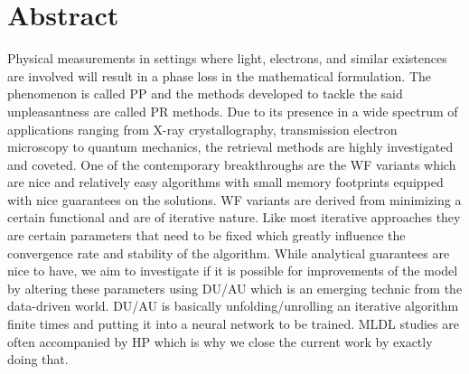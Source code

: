 \chapter*{Abstract}

Physical measurements in settings where light, electrons, and similar existences are involved will result in a phase 
loss\cite{Shechtman2015} in the mathematical formulation. The phenomenon is called \ac{PP}\cite{Shechtman2015} 
and the methods developed to tackle the said unpleasantness are called 
\ac{PR}\cite{Jaganathan2015}\cite{Liu2019} methods. Due to its presence in a wide spectrum of 
applications\cite{Shechtman2015}\cite{Candes2014} ranging from X-ray crystallography, transmission electron microscopy 
to quantum mechanics, the retrieval methods are highly investigated and coveted\cite{Jaganathan2015}\cite{Liu2019}. 
One of the contemporary breakthroughs are the \ac{WF}\cite{Candes2014}\cite{Liu2019} variants which are nice and relatively easy algorithms 
with small memory footprints equipped with nice guarantees on the solutions. \ac{WF}\cite{Liu2019} variants are derived from minimizing a 
certain functional and are of iterative nature. Like most iterative approaches they are certain parameters that need to be fixed which 
greatly influence the convergence rate and stability of the algorithm. While analytical guarantees are nice to have, we aim 
to investigate if it is possible for improvements of the model by altering these parameters using \ac{DU}/\ac{AU}\cite{Monga2019} 
which is an emerging technic from the data-driven world. \ac{DU}/\ac{AU} is basically unfolding/unrolling an 
iterative algorithm finite times and putting it into a neural network to be trained. \ac{ML}\ac{DL} studies are often accompanied 
by \ac{HP} which is why we close the current work by exactly doing that.   
\endinput